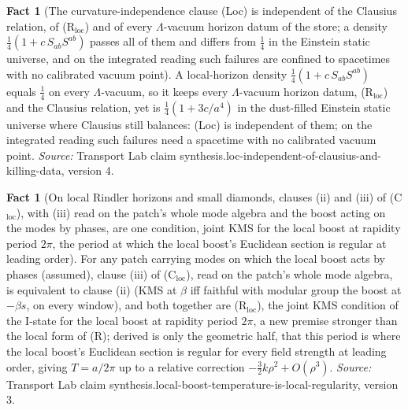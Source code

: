\documentclass[11pt]{article}
\theoremstyle{definition}
\newtheorem{fact}[theorem]{Fact}
\theoremstyle{plain}
\begin{document}
\begin{fact}[The curvature-independence clause (Loc) is independent of the Clausius relation, of (R$_{\mathrm{loc}}$) and of every $\Lambda$-vacuum horizon datum of the store; a density $\tfrac14(1 + c\,S_{ab}S^{ab})$ passes all of them and differs from $\tfrac14$ in the Einstein static universe, and on the integrated reading such failures are confined to spacetimes with no calibrated vacuum point]\label{c:synthesis.loc-independent-of-clausius-and-killing-data}
A local-horizon density $\tfrac14(1 + c\,S_{ab}S^{ab})$ equals $\tfrac14$ on every $\Lambda$-vacuum, so it keeps every $\Lambda$-vacuum horizon datum, (R$_{\mathrm{loc}}$) and the Clausius relation, yet is $\tfrac14(1 + 3c/a^{4})$ in the dust-filled Einstein static universe where Clausius still balances: (Loc) is independent of them; on the integrated reading such failures need a spacetime with no calibrated vacuum point.
\emph{Source:} Transport Lab claim synthesis.loc-independent-of-clausius-and-killing-data, version 4.
\end{fact}

\begin{fact}[On local Rindler horizons and small diamonds, clauses (ii) and (iii) of (C$_{\mathrm{loc}}$), with (iii) read on the patch's whole mode algebra and the boost acting on the modes by phases, are one condition, joint KMS for the local boost at rapidity period $2\pi$, the period at which the local boost's Euclidean section is regular at leading order]\label{c:synthesis.local-boost-temperature-is-local-regularity}
For any patch carrying modes on which the local boost acts by phases (assumed), clause (iii) of (C$_{\mathrm{loc}}$), read on the patch's whole mode algebra, is equivalent to clause (ii) (KMS at $\beta$ iff faithful with modular group the boost at $-\beta s$, on every window), and both together are (R$_{\mathrm{loc}}$), the joint KMS condition of the I-state for the local boost at rapidity period $2\pi$, a new premise stronger than the local form of (R); derived is only the geometric half, that this period is where the local boost's Euclidean section is regular for every field strength at leading order, giving $T = a/2\pi$ up to a relative correction $-\tfrac32k\rho^{2} + O(\rho^{3})$.
\emph{Source:} Transport Lab claim synthesis.local-boost-temperature-is-local-regularity, version 3.
\end{fact}
\end{document}
